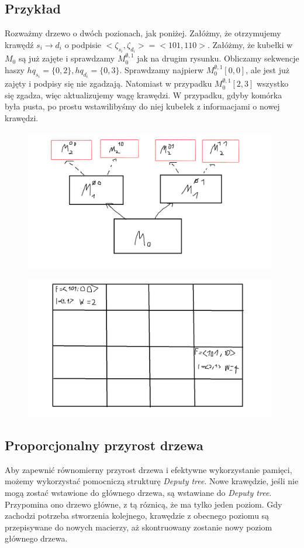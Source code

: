\documentclass{article}
\theoremstyle{definition}
\begin{document}
    \subsection{Przykład}
        Rozważmy drzewo o dwóch pozionach, jak poniżej. Załóżmy, że otrzymujemy krawędź $s_i \rightarrow d_i$ o podpisie $<\zeta_{s_i},\zeta_{d_i}> = <101, 110>$. Załóżmy, że kubełki w $M_0$ są już zajęte i sprawdzamy $M_0^{\emptyset, 1}$ jak na drugim rysunku. Obliczamy sekwencje haszy $hq_{s_i} = \{0, 2\}, hq_{d_i} = \{0, 3\}$. Sprawdzamy najpierw $M_0^{\emptyset, 1}[0,0]$, ale jest już zajęty i podpisy się nie zgadzają. Natomiast w przypadku $M_0^{\emptyset, 1}[2,3]$ wszystko się zgadza, więc aktualizujemy wagę krawędzi. W przypadku, gdyby komórka była pusta, po prostu wstawilibyśmy do niej kubełek z informacjami o nowej krawędzi. 
    \begin{figure}[H]
        \includegraphics[width=11cm]{img/Auxo1.png}
        \centering
    \end{figure}
        \begin{figure}[H]
        \includegraphics[width=11cm]{img/Auxo2.png}
        \centering
    \end{figure}

    \subsection{Proporcjonalny przyrost drzewa}
        Aby zapewnić równomierny przyrost drzewa i efektywne wykorzystanie pamięci, możemy wykorzystać pomocniczą strukturę \textit{Deputy tree}. Nowe krawędzie, jeśli nie mogą zostać wstawione do głównego drzewa, są wstawiane do \textit{Deputy tree}. Przypomina ono drzewo główne, z tą róznicą, że ma tylko jeden poziom. Gdy zachodzi potrzeba stworzenia kolejnego, krawędzie z obecnego poziomu są przepisywane do nowych macierzy, aż skontruowany zostanie nowy poziom głównego drzewa.
    
\end{document}
